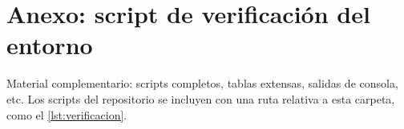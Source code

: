 \section{Anexo: script de verificación del entorno}
\label{anx:esquema}

Material complementario: scripts completos, tablas extensas, salidas de consola, etc.
Los scripts del repositorio se incluyen con una ruta relativa a esta carpeta, como el
\cref{lst:verificacion}.


